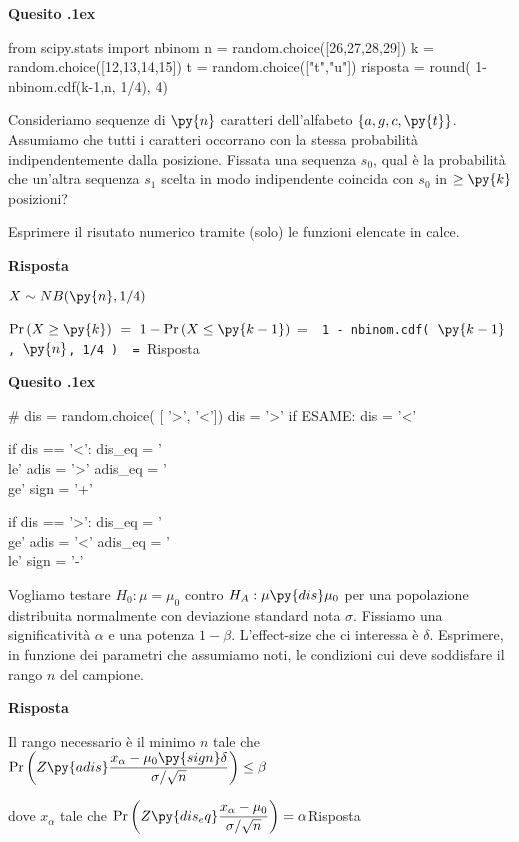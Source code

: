 \documentclass[11pt,twoside,a4paper]{article}
\newcounter{quesito}
\newenvironment{question}{\addtocounter{quesito}{1}\par\textbf{Quesito \thequesito.\kern1ex}}{\vspace{0.5\parskip}}
\newenvironment{answer}{\par\textbf{Risposta\quad}}{\vspace{\parskip}}
\begin{document}
   
\begin{question}
\begin{pycode}
from scipy.stats import nbinom
n = random.choice([26,27,28,29])
k = random.choice([12,13,14,15])
t = random.choice(["t","u"])
risposta = round( 1- nbinom.cdf(k-1,n, 1/4), 4)
\end{pycode}
Consideriamo sequenze di $\py{n}$ caratteri dell'alfabeto $\{a,g,c,\py{t}\}$. 
Assumiamo che tutti i caratteri occorrano con la stessa probabilità indipendentemente dalla posizione.
Fissata una sequenza $s_0$, qual è la probabilità che un'altra sequenza $s_1$ 
scelta in modo indipendente coincida con $s_0$ in $\ge\py{k}$ posizioni?   

Esprimere il risutato numerico tramite (solo) le funzioni elencate in calce.
\begin{answer}
    
  $X\sim NB(\py{n}, 1/4)$
  
  $\Pr(X\ge \py{k})\ =\ 1-\Pr(X\le \py{k-1})$
  \quad =\ 
  {\tt{\color{blue}  1 -  nbinom.cdf( $\py{k-1}$, $\py{n}$, 1/4 )}
  \ =\ 
  \py{risposta}}{\color{blue}\hfill Risposta}
\end{answer}
  \end{question}


\begin{question} %
\begin{pycode}
# dis = random.choice( [ '>', '<'])
dis =  '>'
if ESAME: dis = '<'

if dis == '<':
   dis_eq  = '\\le'
   adis    = '>'
   adis_eq = '\\ge'
   sign = '+'

if dis == '>':
   dis_eq  = '\\ge'
   adis    = '<'
   adis_eq = '\\le'
   sign = '-'

\end{pycode}
Vogliamo testare $H_0:\mu=\mu_0$ contro $H_A:\mu\py{dis}\mu_0$ per una popolazione distribuita normalmente con deviazione standard nota $\sigma$. Fissiamo una significatività $\alpha$ e una potenza $1-\beta$. L'effect-size che ci interessa è $\delta$.  Esprimere, in funzione dei parametri che assumiamo noti, le condizioni cui deve soddisfare il rango $n$ del campione.

\begin{answer}

{\color{blue}Il rango necessario è il minimo $n$ tale che $\displaystyle\Pr\bigg(Z\py{adis}\frac{x_\alpha-\mu_0\py{sign}\delta}{\sigma/\sqrt{n}}\bigg)\le\beta$

dove $x_\alpha$ tale che $\displaystyle\Pr\bigg(Z\py{dis_eq} \frac{x_\alpha-\mu_0}{\sigma/\sqrt{n}}\bigg)=\alpha$\hfill Risposta}


\end{answer}


\end{question}
\end{document}
